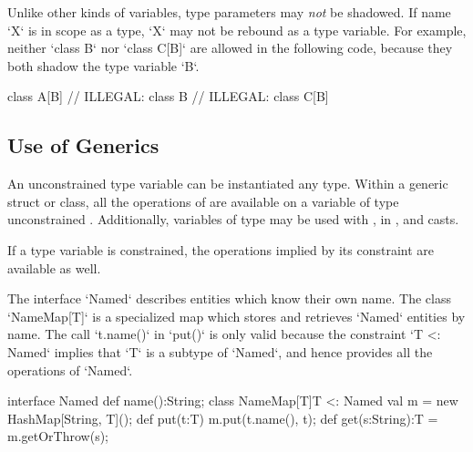 Unlike other kinds of variables, type parameters may {\em not} be shadowed.  
If name \xcd`X` is in scope as a type, \xcd`X` may not be rebound as a type
variable.  
For example, neither \xcd`class B` nor \xcd`class C[B]` are allowed in the
following code, because they both shadow the type variable \xcd`B`.
\begin{xten}
class A[B] {
  // ILLEGAL: class B{} 
  // ILLEGAL: class C[B]{} 
}
\end{xten}
%


\subsection{Use of Generics}

An unconstrained type variable  can be instantiated any type. Within a
generic struct or class, all the operations of  are available on a
variable of type unconstrained . Additionally, variables of type
 may be used with \Xcd{==, !=}, in , and casts.  

If a type variable is constrained, the operations implied by its constraint
are available as well.

\begin{ex}
The interface \xcd`Named` describes entities which know their own name.  The
class \xcd`NameMap[T]` is a specialized map which stores and retrieves
\xcd`Named` entities by name.  The call \xcd`t.name()` in \xcd`put()` is only
valid because the constraint \xcd`{T <: Named}` implies that \xcd`T` is a
subtype of \xcd`Named`, and hence provides all the operations of \xcd`Named`. 
\begin{xten}
interface Named { def name():String; }
class NameMap[T]{T <: Named} {
   val m = new HashMap[String, T]();
   def put(t:T) { m.put(t.name(), t); }
   def get(s:String):T = m.getOrThrow(s);
}
\end{xten}
%


\end{ex}


